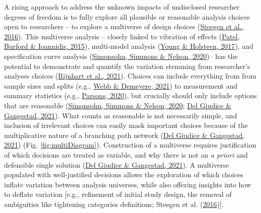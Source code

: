 \documentclass[10pt,a4paper]{article}
\begin{document}
A rising approach to address the unknown impacts of undisclosed researcher degrees of freedom is to fully explore all plausible or reasonable analysis choices open to researchers -- to explore a multiverse of design choices (\protect\hyperlink{ref-steegen_increasing_2016}{Steegen et al., 2016}).
This multiverse analysis -- closely linked to vibration of effects (\protect\hyperlink{ref-patel_assessment_2015}{Patel, Burford \& Ioannidis, 2015}), multi-model analysis (\protect\hyperlink{ref-young_model_2017}{Young \& Holsteen, 2017}), and specification curve analysis (\protect\hyperlink{ref-simonsohn_specification_2020}{Simonsohn, Simmons \& Nelson, 2020})-- has the potential to demonstrate and quantify the variation stemming from researcher's analyses choices (\protect\hyperlink{ref-rijnhart_assessing_2021}{Rijnhart et al., 2021}).
Choices can include everything from from sample sizes and splits (e.g., \protect\hyperlink{ref-webb_multiverse_2021}{Webb \& Demeyere, 2021}) to measurement and summary statistics (e.g., \protect\hyperlink{ref-parsons_exploring_2020}{Parsons, 2020}), but crucially should only include options that are reasonable (\protect\hyperlink{ref-simonsohn_specification_2020}{Simonsohn, Simmons \& Nelson, 2020}; \protect\hyperlink{ref-del_giudice_travelers_2021}{Del Giudice \& Gangestad, 2021}).
What counts as reasonable is not necessarily simple, and inclusion of irrelevant choices can easily mask important choices because of the multiplicative nature of a branching path network (\protect\hyperlink{ref-del_giudice_travelers_2021}{Del Giudice \& Gangestad, 2021}) (Fig. \ref{fig:multiDiagram}).
Construction of a multiverse requires justification of which decisions are treated as variable, and why there is not an \emph{a priori} and defensible single solution (\protect\hyperlink{ref-del_giudice_travelers_2021}{Del Giudice \& Gangestad, 2021}).
A multiverse populated with well-justified decisions allows the exploration of which choices inflate variation between analysis universes, while also offering insights into how to deflate variation {[}e.g., refinement of initial study design, the removal of ambiguities like tightening categories definitions; Steegen et al. (\protect\hyperlink{ref-steegen_increasing_2016}{2016}){]}.
\end{document}
